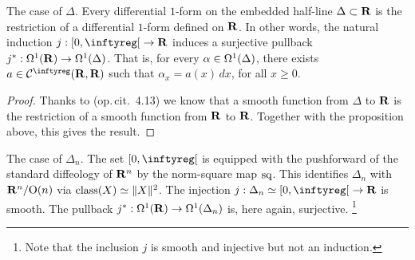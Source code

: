 \begin{Article}{The case of $\Delta$.}{}
  Every differential $1$-form on the embedded half-line $\Delta \subset \mathbf{R}$ is the restriction of a differential $1$-form defined on $\mathbf{R}$.
  In other words,
  the natural induction $j : \LeftClosedInterval{0,\infty} \to \RR$ induces a surjective pullback $j^* : \Omega^1(\mathbf{R}) \to \Omega^1(\Delta)$.
  That is, for every $\alpha \in \Omega^1(\Delta)$,
  there exists $a\in \Cinfty(\RR,\RR)$ such that $\alpha_x=a(x)\, dx$, for all $x\geq 0$.
\end{Article}

\begin{proof}
  Thanks to (op.\,cit. \textsection\,4.13) we know that a smooth function from $\Delta$ to $\mathbf{R}$ is the restriction of a smooth function from $\mathbf{R}$ to $\mathbf{R}$.
  Together with the proposition above, this gives the result.
\end{proof}

\begin{Article}{The case of $\Delta_n$.}{}
  The set $\LeftClosedInterval{0,\infty}$ is equipped with the pushforward of the standard diffeology of $\mathbf{R}^n$
  by the norm-square map ${\operatorname{sq}}$.
  This identifies $\Delta_n$ with $\mathbf{R}^n/\mathrm{O}(n)$ via $\operatorname{class}(X) \simeq \Vert X \Vert^2$.
  The injection $j:\Delta_n \simeq \LeftClosedInterval{0,\infty} \to \RR$ is smooth.
  The pullback $j^* : \Omega^1(\mathbf{R}) \to \Omega^1(\Delta_n)$ is, here again,
  surjective.%
  \footnote{Note that the inclusion $j$ is smooth and injective but not an induction.}
\end{Article}

